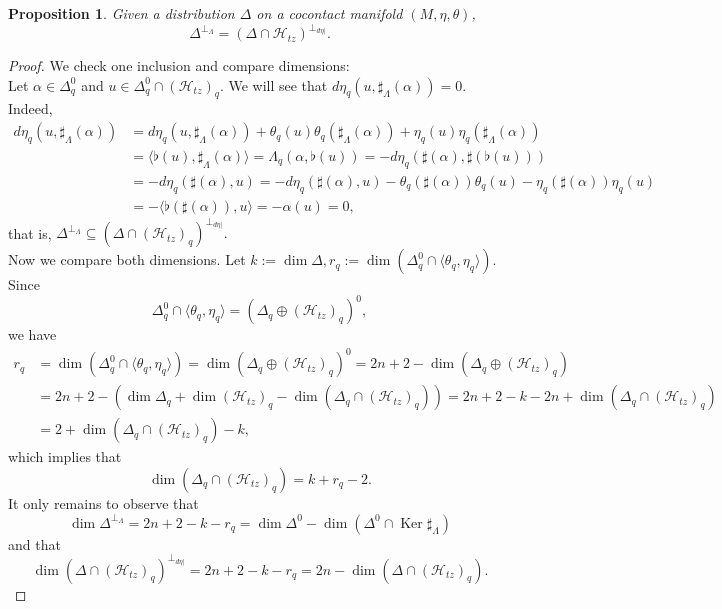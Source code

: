 \documentclass[12pt]{article}
\newtheorem{prop}{Proposition}[section]
\renewcommand{\dim}{\operatorname{dim}}
\renewcommand{\ker}{\operatorname{Ker}}
\begin{document}
\begin{prop} \label{CocontactOrthogonal}Given a distribution $\Delta$ on a cocontact manifold $(M, \eta, \theta)$, $$\Delta^{\perp_\Lambda} = (\Delta \cap \mathcal{H}_{tz})^{\perp_{d\eta |}}.$$
\end{prop}
\begin{proof} We check one inclusion and compare dimensions:\\
Let $\alpha \in \Delta^0_q$ and $u \in \Delta^0_q \cap (\mathcal{H}_{tz})_q.$ We will see that $d\eta_q(u,\sharp_\Lambda(\alpha)) = 0.$ Indeed, 
\begin{align*}
 d\eta_q(u, \sharp_\Lambda(\alpha)) &= d\eta_q(u, \sharp_\Lambda(\alpha)) + \theta_q(u) \theta_q(\sharp_\Lambda(\alpha)) + \eta_q(u) \eta_q(\sharp_\Lambda(\alpha)) \\
 &= \langle \flat(u), \sharp_\Lambda(\alpha) \rangle = \Lambda_q(\alpha, \flat(u)) = - d\eta_q(\sharp(\alpha), \sharp (\flat(u)))\\
 &= - d\eta_q(\sharp(\alpha), u) = -  d\eta_q(\sharp(\alpha),u) - \theta_q(\sharp(\alpha))\theta_q(u) - \eta_q(\sharp(\alpha))\eta_q(u)\\
 & = -\langle \flat(\sharp(\alpha)), u\rangle = - \alpha(u) = 0,
\end{align*}
that is, $\Delta^{\perp_\Lambda} \subseteq (\Delta \cap (\mathcal{H}_{tz})_q)^{\perp_{ d\eta|}}.$\\

Now we compare both dimensions. Let $k:= \dim \Delta, r_q := \dim(\Delta_q^0 \cap\langle \theta_q, \eta_q\rangle).$ Since $$\Delta_q^0 \cap \langle \theta_q, \eta_q\rangle = (\Delta_q \oplus (\mathcal{H}_{tz})_q)^0,$$ we have 
\begin{align*}
r_q &= \dim (\Delta_q^0 \cap \langle \theta_q, \eta_q\rangle) = \dim(\Delta_q \oplus (\mathcal{H}_{tz})_q)^0 = 2n +2 - \dim (\Delta_q \oplus (\mathcal{H}_{tz})_q)\\
&= 2n + 2 - (\dim \Delta_q + \dim (\mathcal{H}_{tz})_q - \dim(\Delta_q \cap (\mathcal{H}_{tz})_q) ) = 2n + 2  - k - 2n + \dim (\Delta_q \cap (\mathcal{H}_{tz})_q)\\
&= 2 + \dim (\Delta_q \cap (\mathcal{H}_{tz})_q) - k,
\end{align*}
which implies that $$\dim (\Delta_q \cap (\mathcal{H}_{tz})_q) = k + r_q - 2.$$
It only remains to observe that $$\dim \Delta^{\perp_\Lambda} = 2n + 2 - k - r_q = \dim \Delta^0 - \dim (\Delta^0 \cap \ker \sharp_\Lambda)$$ and that $$\dim(\Delta \cap (\mathcal{H}_{tz})_q)^{\perp_{d\eta |}} = 2n + 2 - k - r_q = 2n - \dim(\Delta \cap (\mathcal{H}_{tz})_q). $$
\end{proof}
\end{document}
